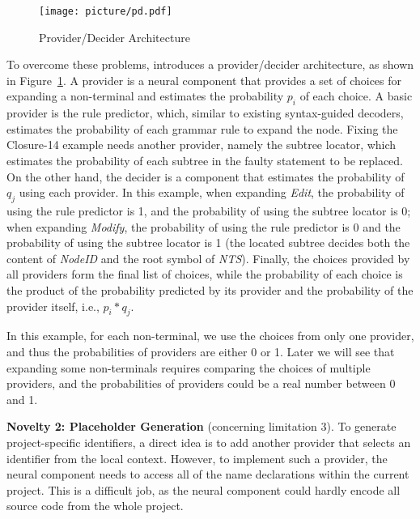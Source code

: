 \begin{figure}
    \centering
    \texttt{[image: picture/pd.pdf]}
    \vspace{-7mm}
    \caption{Provider/Decider Architecture}
    \vspace{-4mm}
    \label{fig:pd}
\end{figure}

To overcome these problems, \techname introduces a provider/decider architecture, as shown in Figure~\ref{fig:pd}. A provider is a neural component that provides a set of choices for expanding a non-terminal and estimates the probability $p_i$ of each choice. A basic provider is the rule predictor, which, similar to existing syntax-guided decoders, estimates the probability of each grammar rule to expand the node. Fixing the Closure-14 example needs another provider, namely the subtree locator, which estimates the probability of each subtree in the faulty statement to be replaced. On the other hand, the decider is a component that estimates the probability of $q_j$ using each provider. In this example, when expanding {\it Edit}, the probability of using the rule predictor is 1, and the probability of using the subtree locator is 0; when expanding {\it Modify}, the probability of using the rule predictor is 0 and the probability of using the subtree locator is 1 (the located subtree decides both the content of {\it NodeID} and the root symbol of {\it NTS}). Finally, the choices provided by all providers form the final list of choices, while the probability of each choice is the product of the probability predicted by its provider and the probability of the provider itself, i.e., $p_i*q_j$. 

In this example, for each non-terminal, we use the choices from only one provider, and thus the probabilities of providers are either 0 or 1. Later we will see that expanding some non-terminals requires comparing the choices of multiple providers, and the probabilities of providers could be a real number between 0 and 1.

{\bf Novelty 2: Placeholder Generation} (concerning limitation 3). 
To generate project-specific identifiers, a direct idea is to add another provider that selects an identifier from the local context. However, to implement such a provider, the neural component needs to access all of the name declarations within the current project. This is a difficult job, as the neural component could hardly encode all source code from the whole project. 

